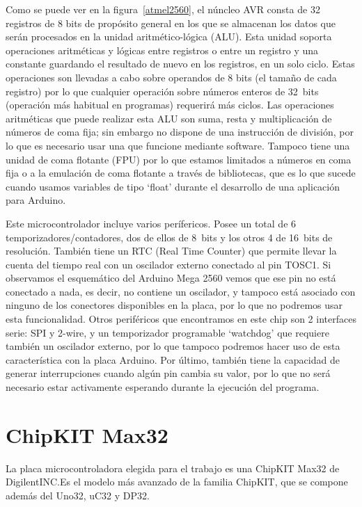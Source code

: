 Como se puede ver en la figura~\ref{atmel2560}, el núncleo AVR consta de 32 registros de 8 bits de propósito general en los que se almacenan los datos que serán procesados en la unidad aritmético-lógica (ALU). Esta unidad soporta operaciones aritméticas y lógicas entre registros o entre un registro y una constante guardando el resultado de nuevo en los registros, en un solo ciclo. Estas operaciones son llevadas a cabo sobre operandos de 8 bits (el tamaño de cada registro) por lo que cualquier operación sobre números enteros de 32~bits (operación más habitual en programas) requerirá más ciclos. Las operaciones aritméticas que puede realizar esta ALU son suma, resta y multiplicación de números de coma fija; sin embargo no dispone de una instrucción de división, por lo que es necesario usar una que funcione mediante software. Tampoco tiene una unidad de coma flotante (FPU) por lo que estamos limitados a números en coma fija o a la emulación de coma flotante a través de bibliotecas, que es lo que sucede cuando usamos variables de tipo `float' durante el desarrollo de una aplicación para Arduino.

Este microcontrolador incluye varios perífericos. Posee un total de 6 temporizadores/contadores, dos de ellos de 8~bits y los otros 4 de 16~bits de resolución. También tiene un RTC (Real Time Counter) que permite llevar la cuenta del tiempo real con un oscilador externo conectado al pin TOSC1. Si observamos el esquemático del Arduino Mega 2560 vemos que ese pin no está conectado a nada, es decir, no contiene un oscilador, y tampoco está asociado con ninguno de los conectores disponibles en la placa, por lo que no podremos usar esta funcionalidad. Otros periféricos que encontramos en este chip son 2 interfaces serie: SPI y 2-wire, y un temporizador programable `watchdog' que requiere también un oscilador externo, por lo que tampoco podremos hacer uso de esta característica con la placa Arduino. Por último, también tiene la capacidad de generar interrupciones cuando algún pin cambia su valor, por lo que no será necesario estar activamente esperando durante la ejecución del programa.

\section{ChipKIT Max32}
La placa microcontroladora elegida para el trabajo es una ChipKIT Max32 de DigilentINC.\@ Es el modelo más avanzado de la familia ChipKIT, que se compone además del Uno32, uC32 y DP32.


